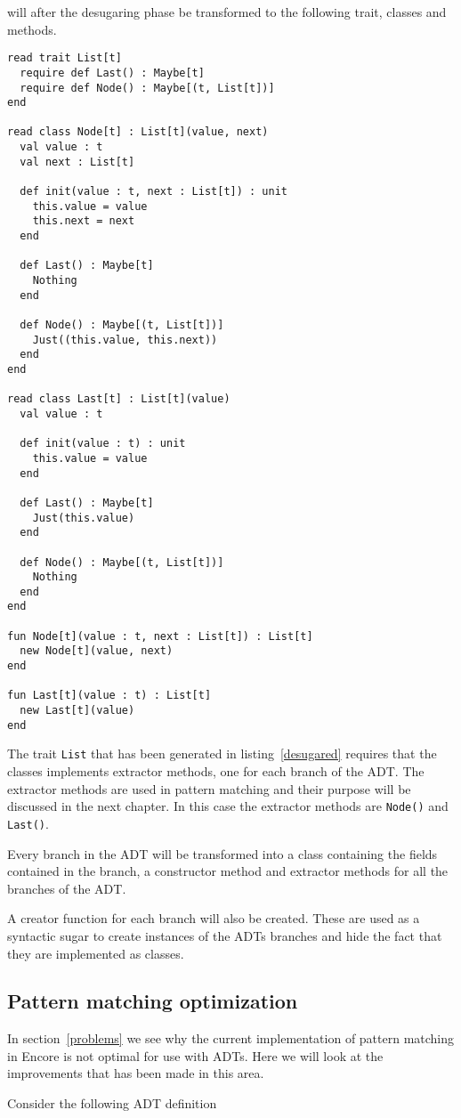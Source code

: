 \documentclass[10pt]{report}
\def\code#1{\texttt{#1}} %
\begin{document}
{\par{will after the desugaring phase be transformed to the following trait, classes and methods.}

\begin{lstlisting}[language=encore,caption={Desugared linked list},label=desugared]
read trait List[t]
  require def Last() : Maybe[t]
  require def Node() : Maybe[(t, List[t])]
end

read class Node[t] : List[t](value, next)
  val value : t
  val next : List[t]

  def init(value : t, next : List[t]) : unit
    this.value = value
    this.next = next
  end

  def Last() : Maybe[t]
    Nothing
  end

  def Node() : Maybe[(t, List[t])]
    Just((this.value, this.next))
  end
end

read class Last[t] : List[t](value)
  val value : t

  def init(value : t) : unit
    this.value = value
  end

  def Last() : Maybe[t]
    Just(this.value)
  end

  def Node() : Maybe[(t, List[t])]
    Nothing
  end
end

fun Node[t](value : t, next : List[t]) : List[t]
  new Node[t](value, next)
end

fun Last[t](value : t) : List[t]
  new Last[t](value)
end

\end{lstlisting}

\par{The trait \code{List} that has been generated in listing~\ref{desugared} requires that the classes implements extractor methods, one for each branch of the ADT\@. The extractor methods are used in pattern matching and their purpose will be discussed in the next chapter. In this case the extractor methods are \code{Node()} and \code{Last()}.}

\par{Every branch in the ADT will be transformed into a class containing the fields contained in the branch, a constructor method and extractor methods for all the branches of the ADT.}

\par{A creator function for each branch will also be created. These are used as a syntactic sugar to create instances of the ADTs branches and hide the fact that they are implemented as classes.}

\subsection{Pattern matching optimization}
\par{In section~\ref{problems} we see why the current implementation of pattern matching in Encore is not optimal for use with ADTs. Here we will look at the improvements that has been made in this area.}
\par{Consider the following ADT definition}

}
\end{document}
